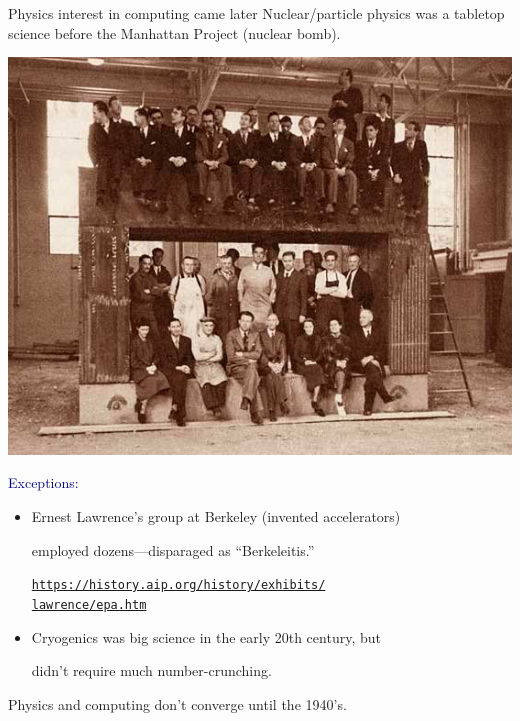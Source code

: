 \documentclass[aspectratio=169]{beamer}
\begin{document}
\begin{frame}{Physics interest in computing came later}
\Large
\vspace{0.5 cm}
Nuclear/particle physics was a tabletop science before the Manhattan Project (nuclear bomb).

\normalsize
\vspace{0.75 cm}
\hfill\mbox{\includegraphics[height=3.3 cm]{bigsci-lblstaff.jpg}\hspace{-0.7 cm}}

\vspace{-3.8 cm}
\textcolor{darkblue}{\large Exceptions:}
\begin{itemize}
\item Ernest Lawrence's group at Berkeley (invented accelerators)

employed dozens---disparaged as ``Berkeleitis.''

\textcolor{blue}{\small\href{https://history.aip.org/history/exhibits/lawrence/epa.htm}{\tt https://history.aip.org/history/exhibits/\\lawrence/epa.htm}}

\item Cryogenics was big science in the early 20th century, but

didn't require much number-crunching.
\end{itemize}

\Large
\vspace{0.5 cm}
Physics and computing don't converge until the 1940's.
\end{frame}
\end{document}
